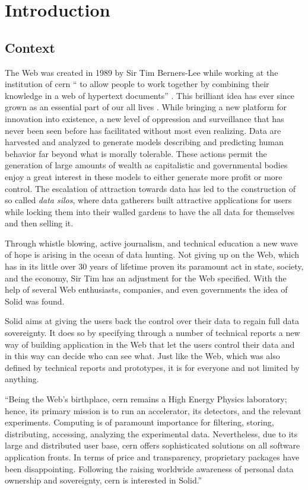 \chapter{Introduction}
\section{Context}

The Web was created in 1989 by Sir Tim Berners-Lee while working at the institution of \gls{cern} “\textelp{} to allow people to work together by combining their knowledge in a web of hypertext documents” \cite{timbl-bio}. This brilliant idea has ever since grown as an essential part of our all lives \cite{cern-solid-investigation-spec}. While bringing a new platform for innovation into existence, a new level of oppression and surveillance that has never been seen before has facilitated without most even realizing. Data are harvested and analyzed to generate models describing and predicting human behavior far beyond what is morally tolerable. These actions permit the generation of large amounts of wealth as capitalistic and governmental bodies enjoy a great interest in these models to either generate more profit or more control. The escalation of attraction towards data has led to the construction of so called \textit{data silos}, where data gatherers built attractive applications for users while locking them into their walled gardens to have the all data for themselves and then selling it.

Through whistle blowing, active journalism, and technical education a new wave of hope is arising in the ocean of data hunting. Not giving up on the Web, which has in its little over 30 years of lifetime proven its paramount act in state, society, and the economy, Sir Tim has an adjustment for the Web specified. With the help of several Web enthusiasts, companies, and even governments the idea of Solid was found.

Solid aims at giving the users back the control over their data to regain full data sovereignty. It does so by specifying through a number of technical reports a new way of building application in the Web that let the users control their data and in this way can decide who can see what. Just like the Web, which was also defined by technical reports and prototypes, it is for everyone and not limited by anything. 

“Being the Web’s birthplace, \gls{cern} remains a High Energy Physics laboratory; hence, its primary mission is to run an accelerator, its detectors, and the relevant experiments. Computing is of paramount importance for filtering, storing, distributing, accessing, analyzing the experimental data. Nevertheless, due to its large and distributed user base, \gls{cern} offers sophisticated solutions on all software application fronts. In terms of price and transparency, proprietary packages have been disappointing. Following the raising worldwide awareness of personal data ownership and sovereignty, \gls{cern} is interested in Solid.” \cite{cern-solid-investigation-spec}

